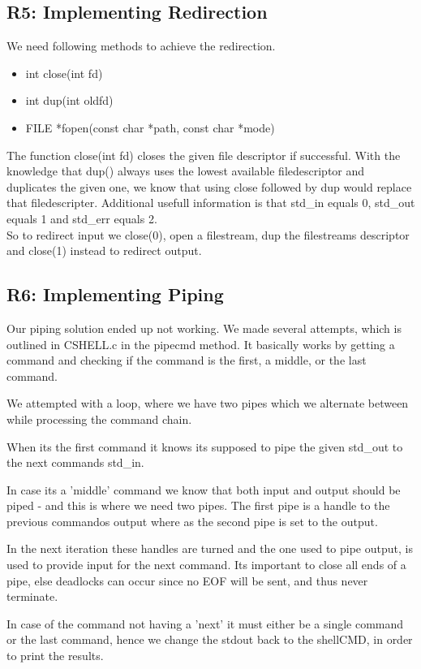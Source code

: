 \subsection{R5: Implementing Redirection}
We need following methods to achieve the redirection.
\begin{itemize}
\item int close(int fd)
\item int dup(int oldfd)
\item FILE *fopen(const char *path, const char *mode)
\end{itemize}
The function close(int fd) closes the given file descriptor if successful. With the knowledge that dup() always uses the lowest available filedescriptor and duplicates the given one, we know that using close followed by dup would replace that filedescripter.
Additional usefull information is that std\_in equals 0, std\_out equals 1 and std\_err equals 2.\\
So to  redirect input we close(0), open a filestream, dup the filestreams descriptor and close(1) instead to redirect output.

\subsection{R6: Implementing Piping}
Our piping solution ended up not working. We made several attempts, which is outlined in CSHELL.c in the pipecmd method.
It basically works by getting a command and checking if the command is the first, a middle, or the last command.

We attempted with a loop, where we have two pipes which we alternate between while processing the command chain.

When its the first command it knows its supposed to pipe the given std\_out to the next commands std\_in.

In case its a 'middle' command we know that both input and output should be piped - and this is where we need two pipes. The first pipe is a handle to the previous commandos output where as the second pipe is set to the output.

In the next iteration these handles are turned and the one used to pipe output, is used to provide input for the next command.
Its important to close all ends of a pipe, else deadlocks can occur since no EOF will be sent, and thus never terminate.

In case of the command not having a 'next' it must either be a single command or the last command, hence we change the stdout back to the shellCMD, in order to print the results.
  
